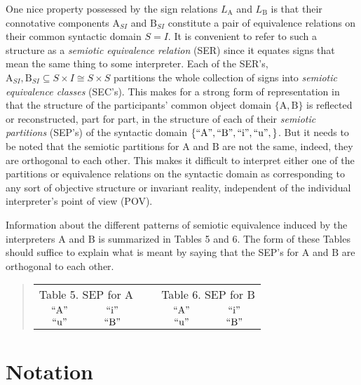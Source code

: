 \documentclass[12pt]{article}
\begin{document}
One nice property possessed by the sign relations $L_{\mathrm{A}}$ and $L_{\mathrm{B}}$ is that their connotative components $\mathrm{A}_{SI}$ and $\mathrm{B}_{SI}$ constitute a pair of equivalence relations on their common syntactic domain $S = I$.  It is convenient to refer to such a structure as a \textit{semiotic equivalence relation} (SER) since it equates signs that mean the same thing to some interpreter.  Each of the SER's, $\mathrm{A}_{SI}, \mathrm{B}_{SI} \subseteq S \times I \cong S \times S$ partitions the whole collection of signs into \textit{semiotic equivalence classes} (SEC's).  This makes for a strong form of representation in that the structure of the participants' common object domain $\{ \mathrm{A}, \mathrm{B} \}$ is reflected or reconstructed, part for part, in the structure of each of their \textit{semiotic partitions} (SEP's) of the syntactic domain $\{ \mathrm{``A"}, \mathrm{``B"}, \mathrm{``i"}, \mathrm{``u"}, \}$.  But it needs to be noted that the semiotic partitions for $\mathrm{A}$ and $\mathrm{B}$ are not the same, indeed, they are orthogonal to each other.  This makes it difficult to interpret either one of the partitions or equivalence relations on the syntactic domain as corresponding to any sort of objective structure or invariant reality, independent of the individual interpreter's point of view (POV).

Information about the different patterns of semiotic equivalence induced by the interpreters $\mathrm{A}$ and $\mathrm{B}$ is summarized in Tables 5 and 6.  The form of these Tables should suffice to explain what is meant by saying that the SEP's for $\mathrm{A}$ and $\mathrm{B}$ are orthogonal to each other.

\begin{quote}\begin{tabular}{|p{5mm}cp{5mm}p{5mm}cp{5mm}|p{1cm}|p{5mm}cp{5mm}|p{5mm}cp{5mm}|}
\multicolumn{6}{c}{Table 5.  SEP for $\mathrm{A}$} &
\multicolumn{1}{c}{~} &
\multicolumn{6}{c}{Table 6.  SEP for $\mathrm{B}$} \\
\cline{1-6}\cline{8-13}
& $\mathrm{``A"}$ &&& $\mathrm{``i"}$ &&&& $\mathrm{``A"}$ &&& $\mathrm{``i"}$ & \\
\cline{1-6}
& $\mathrm{``u"}$ &&& $\mathrm{``B"}$ &&&& $\mathrm{``u"}$ &&& $\mathrm{``B"}$ & \\
\cline{1-6}\cline{8-13}
\end{tabular}\end{quote}

\section{Notation}
\end{document}
